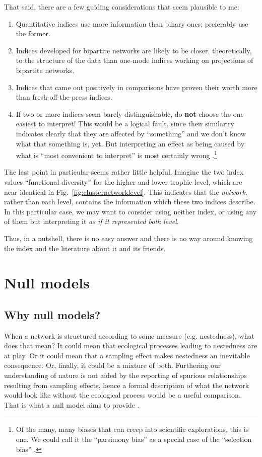 \documentclass[a4paper, 11pt]{article}\usepackage[]{graphicx}\usepackage[dvipsnames]{xcolor}
\begin{document}
That said, there are a few guiding considerations that seem plausible to me:
\begin{enumerate}
\item Quantitative indices use more information than binary ones; preferably use the former.
\item Indices developed for bipartite networks are likely to be closer, theoretically, to the structure of the data than one-mode indices working on projections of bipartite networks.
\item Indices that came out positively in comparisons have proven their worth more than fresh-off-the-press indices.
\item If two or more indices seem barely distinguishable, do \textbf{not} choose the one easiest to interpret! This would be a logical fault, since their similarity indicates clearly that they are affected by ``something'' and we don't know what that something is, yet. But interpreting an effect as being caused by what is ``most convenient to interpret'' is most certainly wrong \citep{Shermer2012}.\footnote{Of the many, many biases that can creep into scientific explorations, this is one. We could call it the ``parsimony bias'' as a special case of the ``selection bias'' \citep{Shermer2012}.}
\end{enumerate}
%
The last point in particular seems rather little helpful. Imagine the two index values ``functional diversity'' for the higher and lower trophic level, which are near-identical in Fig.~\ref{fig:clusternetworklevel}. This indicates that the \emph{network}, rather than each level, contains the information which these two indices describe. In this particular case, we may want to consider using neither index, or using any of them but interpreting it \emph{as if it represented \emph{both} level}.

Thus, in a nutshell, there is no easy answer and there is no way around knowing the index and the literature about it and its friends.





\section{Null models} %
  \label{sec:nullmodels}

\subsection{Why null models?}
When a network is structured according to some measure (e.g. nestedness), what does that mean? It could mean that ecological processes leading to nestedness are at play. Or it could mean that a sampling effect makes nestedness an inevitable consequence. Or, finally, it could be a mixture of both. Furthering our understanding of nature is not aided by the reporting of spurious relationships resulting from sampling effects, hence a formal description of what the network would look like without the ecological process would be a useful comparison. That is what a null model aims to provide \citep{Gotelli1996}. 
\end{document}
